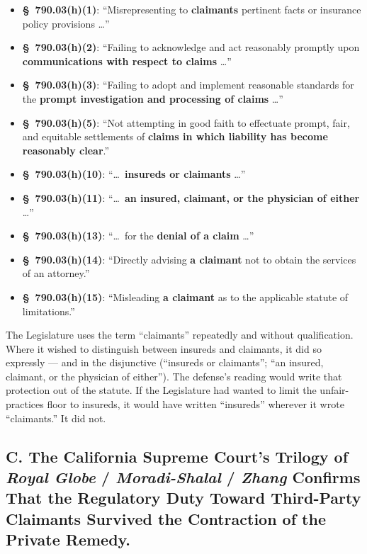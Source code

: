 \begin{itemize}
\tightlist
\item \textbf{\S~790.03(h)(1)}: ``Misrepresenting to \textbf{claimants} pertinent facts or insurance policy provisions \dots''
\item \textbf{\S~790.03(h)(2)}: ``Failing to acknowledge and act reasonably promptly upon \textbf{communications with respect to claims} \dots''
\item \textbf{\S~790.03(h)(3)}: ``Failing to adopt and implement reasonable standards for the \textbf{prompt investigation and processing of claims} \dots''
\item \textbf{\S~790.03(h)(5)}: ``Not attempting in good faith to effectuate prompt, fair, and equitable settlements of \textbf{claims in which liability has become reasonably clear}.''
\item \textbf{\S~790.03(h)(10)}: ``\dots~\textbf{insureds or claimants} \dots''
\item \textbf{\S~790.03(h)(11)}: ``\dots~\textbf{an insured, claimant, or the physician of either} \dots''
\item \textbf{\S~790.03(h)(13)}: ``\dots~for the \textbf{denial of a claim} \dots''
\item \textbf{\S~790.03(h)(14)}: ``Directly advising \textbf{a claimant} not to obtain the services of an attorney.''
\item \textbf{\S~790.03(h)(15)}: ``Misleading \textbf{a claimant} as to the applicable statute of limitations.''
\end{itemize}

The Legislature uses the term ``claimants'' repeatedly and without qualification. Where it wished to distinguish between insureds and claimants, it did so expressly --- and in the disjunctive (``insureds or claimants''; ``an insured, claimant, or the physician of either''). The defense's reading would write that protection out of the statute. If the Legislature had wanted to limit the unfair-practices floor to insureds, it would have written ``insureds'' wherever it wrote ``claimants.'' It did not.

\subsection*{C. The California Supreme Court's Trilogy of \textit{Royal Globe} / \textit{Moradi-Shalal} / \textit{Zhang} Confirms That the Regulatory Duty Toward Third-Party Claimants Survived the Contraction of the Private Remedy.}

